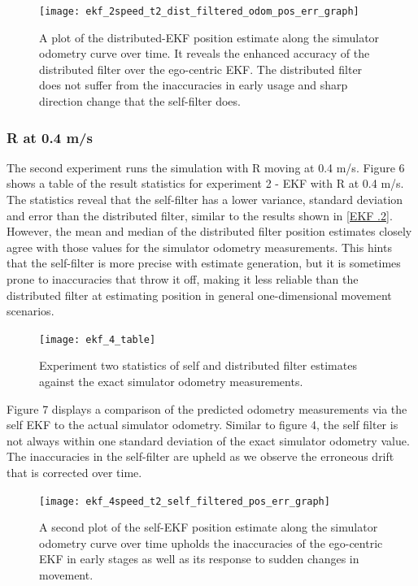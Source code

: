 \documentclass[conference]{IEEEtran} \usepackage[T1]{fontenc} \usepackage[backend=biber, style=ieee]{biblatex}
\begin{document}
\begin{figure}
\centering 
\texttt{[image: ekf\_2speed\_t2\_dist\_filtered\_odom\_pos\_err\_graph]}
\caption {A plot of the distributed-EKF position estimate along the simulator odometry curve over time. It 
reveals the enhanced accuracy of the distributed filter over the ego-centric EKF. The distributed filter does not suffer 
from the inaccuracies in early usage and sharp direction change that the self-filter does.}
\label{pic5}
\end{figure}

\subsubsection{R at 0.4 m/s} \label{EKF .4}
The second experiment runs the simulation with R moving at 0.4 m/s. Figure 6 shows a table of the result statistics for 
experiment 2 - EKF with R at 0.4 m/s. The statistics reveal that the self-filter has a lower variance, standard deviation and error than the 
distributed filter, similar to the results shown in \ref{EKF .2}. However, the mean and median of the distributed filter position estimates closely 
agree with those values for the simulator odometry measurements. This hints that the self-filter is more precise with estimate generation, but it is 
sometimes prone to inaccuracies that throw it off, making it less reliable than the distributed filter at estimating position in general 
one-dimensional movement scenarios.

\begin{figure}[!ht]
\label{pic6} 
\centering 
\texttt{[image: ekf\_4\_table]}
\caption{Experiment two statistics of self and distributed filter estimates against the exact simulator odometry measurements.} 
\end{figure}

Figure 7 displays a comparison of the predicted odometry measurements via the self EKF to the actual simulator 
odometry. Similar to figure 4, the self filter is not always within one standard deviation of the exact simulator 
odometry value. The inaccuracies in the self-filter are upheld as we observe the erroneous drift that is corrected over time.

\begin{figure}
\centering 
\texttt{[image: ekf\_4speed\_t2\_self\_filtered\_pos\_err\_graph]}
\caption {A second plot of the self-EKF position estimate along the simulator odometry curve over time 
upholds the inaccuracies of the ego-centric EKF in early stages as well as its response to sudden changes 
in movement.}
\label{pic7} 
\end{figure}
\end{document}
